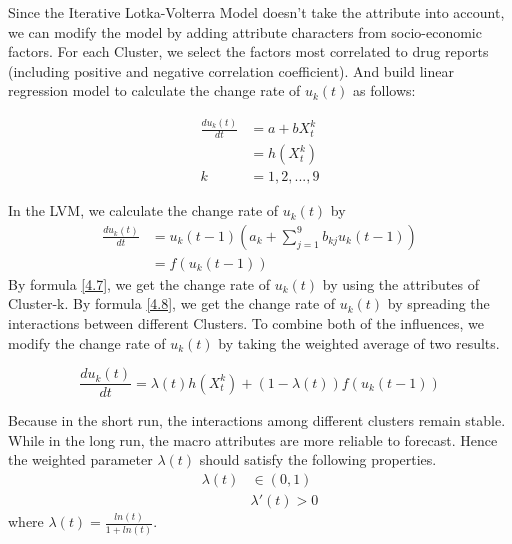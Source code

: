 \documentclass[12pt]{article}
\begin{document}
Since the Iterative Lotka-Volterra Model doesn’t take the attribute into account, we can modify the model by adding attribute characters from socio-economic factors. For each Cluster, we select the factors most correlated to drug reports (including positive and negative correlation coefficient). And build linear regression model to calculate the change rate of $u_k(t)$ as follows:

\begin{equation}
	\begin{aligned}
		\frac{du_{k}(t)}{dt} &= a + bX_{t}^{k} \\
		&=h(X_{t}^{k}) \\
		k &= 1,2,...,9
	\end{aligned}
	\label{4.7}
\end{equation}

In the LVM, we calculate the change rate of $u_{k}(t)$ by
\begin{equation}
	\begin{aligned}
	\frac{du_{k}(t)}{dt} &= u_{k}(t-1)(a_{k} + \sum_{j=1}^{9}b_{kj}u_{k}(t-1)) \\
	&=f(u_{k}(t-1))
	\end{aligned}
	\label{4.8}
\end{equation}
By formula \ref{4.7}, we get the change rate of $u_k(t)$ by using the attributes of Cluster-k. By formula \ref{4.8}, we get the change rate of $u_k(t)$ by spreading the interactions between different Clusters. To combine both of the influences, we modify the change rate of $u_k (t)$ by taking the weighted average of two results.

\begin{equation}
	\frac{du_{k}(t)}{dt} = \lambda(t)h(X_{t}^{k}) + (1-\lambda(t))f(u_{k}(t-1))
\end{equation}

Because in the short run, the interactions among different clusters remain stable. While in the long run, the macro attributes are more reliable to forecast. Hence the weighted parameter $\lambda(t)$ should satisfy the following properties. 
\begin{equation}
	\begin{aligned}
	\lambda(t) &\in (0, 1) \\
	&\lambda'(t) > 0
	\end{aligned}
\end{equation}
where $\lambda(t) = \frac{ln(t)}{1+ln(t)}$.
\end{document}
